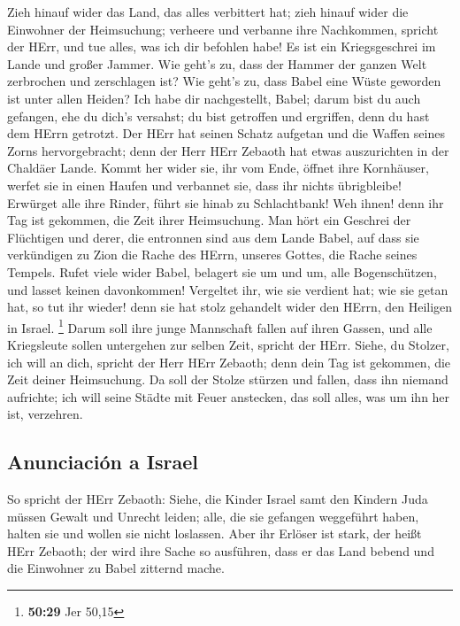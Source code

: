  Zieh hinauf wider das Land, das alles verbittert hat;
zieh hinauf wider die Einwohner der Heimsuchung; verheere und verbanne
ihre Nachkommen, spricht der HErr, und tue alles, was ich dir befohlen
habe!  Es ist ein Kriegsgeschrei im Lande und großer
Jammer.  Wie geht's zu, dass der Hammer der ganzen Welt
zerbrochen und zerschlagen ist? Wie geht's zu, dass Babel eine Wüste
geworden ist unter allen Heiden?  Ich habe dir
nachgestellt, Babel; darum bist du auch gefangen, ehe du dich's
versahst; du bist getroffen und ergriffen, denn du hast dem HErrn
getrotzt.  Der HErr hat seinen Schatz aufgetan und die
Waffen seines Zorns hervorgebracht; denn der Herr HErr Zebaoth hat etwas
auszurichten in der Chaldäer Lande.  Kommt her wider sie,
ihr vom Ende, öffnet ihre Kornhäuser, werfet sie in einen Haufen und
verbannet sie, dass ihr nichts übrigbleibe!  Erwürget
alle ihre Rinder, führt sie hinab zu Schlachtbank! Weh ihnen! denn ihr
Tag ist gekommen, die Zeit ihrer Heimsuchung.  Man hört
ein Geschrei der Flüchtigen und derer, die entronnen sind aus dem Lande
Babel, auf dass sie verkündigen zu Zion die Rache des HErrn, unseres
Gottes, die Rache seines Tempels.  Rufet viele wider
Babel, belagert sie um und um, alle Bogenschützen, und lasset keinen
davonkommen! Vergeltet ihr, wie sie verdient hat; wie sie getan hat, so
tut ihr wieder! denn sie hat stolz gehandelt wider den HErrn, den
Heiligen in Israel. \footnote{\textbf{50:29} Jer 50,15} 
Darum soll ihre junge Mannschaft fallen auf ihren Gassen, und alle
Kriegsleute sollen untergehen zur selben Zeit, spricht der HErr.
 Siehe, du Stolzer, ich will an dich, spricht der Herr
HErr Zebaoth; denn dein Tag ist gekommen, die Zeit deiner Heimsuchung.
 Da soll der Stolze stürzen und fallen, dass ihn niemand
aufrichte; ich will seine Städte mit Feuer anstecken, das soll alles,
was um ihn her ist, verzehren.

\hypertarget{anunciaciuxf3n-a-israel}{%
\subsection{Anunciación a Israel}\label{anunciaciuxf3n-a-israel}}

 So spricht der HErr Zebaoth: Siehe, die Kinder Israel
samt den Kindern Juda müssen Gewalt und Unrecht leiden; alle, die sie
gefangen weggeführt haben, halten sie und wollen sie nicht loslassen.
 Aber ihr Erlöser ist stark, der heißt HErr Zebaoth; der
wird ihre Sache so ausführen, dass er das Land bebend und die Einwohner
zu Babel zitternd mache.

